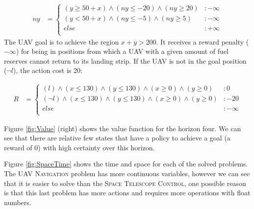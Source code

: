 {\footnotesize
\begin{align*}
ny & = \begin{cases}
(y \geq 50 + x) \wedge (ny \leq -20) \wedge (ny \geq 20) &:-\infty\\
(y < 50 + x) \wedge (ny \leq -5) \wedge (ny \geq 5) &:-\infty\\
else &: +\infty\\
\end{cases}
\end{align*}}
The UAV goal is to achieve the region $x+y > 200$. It receives a reward penalty ($-\infty$) for being in positions  from which a UAV with a given amount of fuel reserves cannot return to its landing strip. If the UAV is not in the goal position ($\neg l$), the action cost is 20:

{\footnotesize
\begin{align*}
R & = \begin{cases}
(l) \wedge (x \leq 130) \wedge (y \leq 130) \wedge (x \geq 0) \wedge (y \geq 0) &:0\\
(\neg l) \wedge (x \leq 130) \wedge (y \leq 130) \wedge (x \geq 0) \wedge (y \geq 0) &:-20\\
else &: -\infty\\
\end{cases}
\end{align*}}

Figure \ref{fig:Value} (right) shows the value function for the horizon four. We can see that there are relative few states that have a policy to achieve a goal (a reward of 0) with high certainty over this horizon.


Figure \ref{fig:SpaceTime} shows the time and space for each of the solved problems. The \textsc{UAV Navigation} problem has more continuous variables, however we can see that it is easier to solve than the \textsc{Space Telescope Control}, one possible reason is that this last problem has more actions and requires more operations with float numbers.
